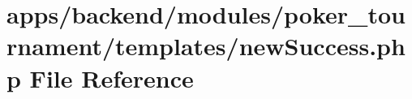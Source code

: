 \hypertarget{backend_2modules_2poker__tournament_2templates_2new_success_8php}{\section{apps/backend/modules/poker\-\_\-tournament/templates/new\-Success.php File Reference}
\label{backend_2modules_2poker__tournament_2templates_2new_success_8php}
}
